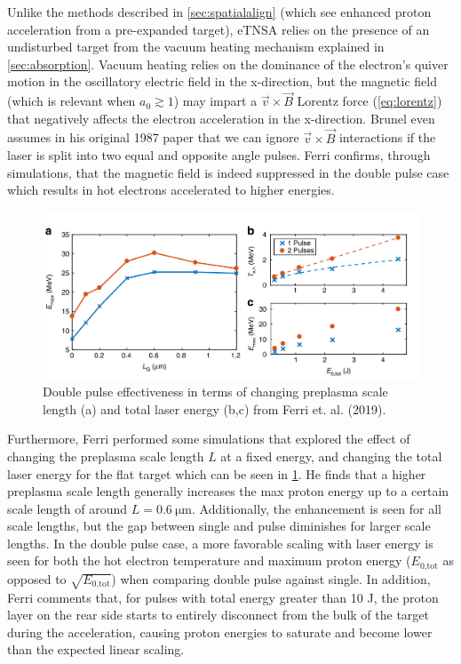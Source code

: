 Unlike the methods described in \cref{sec:spatialalign} (which see enhanced proton acceleration from a pre-expanded target), eTNSA relies on the presence of an undisturbed target from the vacuum heating mechanism\cite{Brunel_1987_PRL} explained in \cref{sec:absorption}. Vacuum heating relies on the dominance of the electron's quiver motion in the oscillatory electric field in the x-direction, but the magnetic field (which is relevant when $a_0 \gtrsim 1$) may impart a $\vec{v} \times \vec{B}$ Lorentz force (\cref{eq:lorentz}) that negatively affects the electron acceleration in the x-direction. Brunel even assumes in his original 1987 paper\cite{Brunel_1987_PRL} that we can ignore $\vec{v} \times \vec{B}$ interactions if the laser is split into two equal and opposite angle pulses. Ferri confirms\cite{Ferri_2019_Nat_Comm}, through simulations, that the magnetic field is indeed suppressed in the double pulse case which results in hot electrons accelerated to higher energies. 

\begin{figure}
	\centering 
	\includegraphics[width=\linewidth]{planning/images/ferri_scale_energy.PNG}
	\caption{Double pulse effectiveness in terms of changing preplasma scale length (a) and total laser energy (b,c) from Ferri et. al. (2019)\cite{Ferri_2019_Nat_Comm}.}
	\label{fig:ferri_scale_energy}
\end{figure}

Furthermore, Ferri performed some simulations that explored the effect of changing the preplasma scale length $L$ at a fixed energy, and changing the total laser energy for the flat target\cite{Ferri_2019_Nat_Comm} which can be seen in \cref{fig:ferri_scale_energy}. He finds that a higher preplasma scale length generally increases the max proton energy up to a certain scale length of around $L = \SI{0.6}{\micro \meter}$. Additionally, the enhancement is seen for all scale lengths, but the gap between single and pulse diminishes for larger scale lengths. In the double pulse case, a more favorable scaling with laser energy is seen for both the hot electron temperature and maximum proton energy ($E_\text{0,tot}$ as opposed to $\sqrt{E_\text{0,tot}}$) when comparing double pulse against single. In addition, Ferri comments that, for pulses with total energy greater than 10 J, the proton layer on the rear side starts to entirely disconnect from the bulk of the target during the acceleration, causing proton energies to saturate and become lower than the expected linear scaling.

